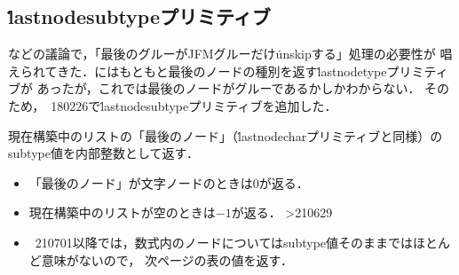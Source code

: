 \documentclass[a4paper,11pt,nomag,dvipdfmx]{jsarticle}
\begin{document}
\subsection{\.{lastnodesubtype}プリミティブ}
\cite{tjb28,plt63}などの議論で，「最後のグルーがJFMグルーだけ\.{unskip}する」処理の必要性が
唱えられてきた．\epTeX にはもともと最後のノードの種別を返す\.{lastnodetype}プリミティブが
あったが，これでは最後のノードがグルーであるかしかわからない．
そのため，\epTeX~180226で\.{lastnodesubtype}プリミティブを追加した．

\begin{cslist}
  現在構築中のリストの「最後のノード」（\.{lastnodechar}プリミティブと同様）の
  subtype値を内部整数として返す．
  \begin{itemize}
    \item 「最後のノード」が文字ノードのときは0が返る．
    \item 現在構築中のリストが空のときは$-1$が返る．
\ifnum\epTeXversion>210629
    \item \epTeX~210701以降では，数式内のノードについてはsubtype値そのままではほとんど意味がないので，
    次ページの表の値を返す．
\fi
  \end{itemize}
\end{cslist}
\end{document}
